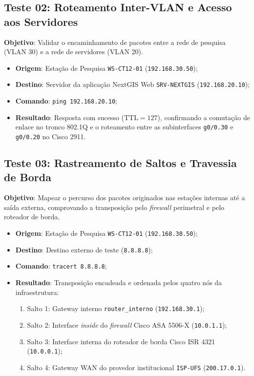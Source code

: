 \subsection{Teste 02: Roteamento Inter-VLAN e Acesso aos Servidores}
\textbf{Objetivo}: Validar o encaminhamento de pacotes entre a rede de pesquisa (VLAN 30) e a rede de servidores (VLAN 20).
\begin{itemize}
    \item \textbf{Origem}: Estação de Pesquisa \texttt{WS-CT12-01} (\texttt{192.168.30.50});
    \item \textbf{Destino}: Servidor da aplicação NextGIS Web \texttt{SRV-NEXTGIS} (\texttt{192.168.20.10});
    \item \textbf{Comando}: \texttt{ping 192.168.20.10};
    \item \textbf{Resultado}: Resposta com sucesso ($\text{TTL} = 127$), confirmando a comutação de enlace no tronco 802.1Q e o roteamento entre as subinterfaces \texttt{g0/0.30} e \texttt{g0/0.20} no Cisco 2911.
\end{itemize}

\subsection{Teste 03: Rastreamento de Saltos e Travessia de Borda}
\textbf{Objetivo}: Mapear o percurso dos pacotes originados nas estações internas até a saída externa, comprovando a transposição pelo \textit{firewall} perimetral e pelo roteador de borda.
\begin{itemize}
    \item \textbf{Origem}: Estação de Pesquisa \texttt{WS-CT12-01} (\texttt{192.168.30.50});
    \item \textbf{Destino}: Destino externo de teste (\texttt{8.8.8.8});
    \item \textbf{Comando}: \texttt{tracert 8.8.8.8};
    \item \textbf{Resultado}: Transposição encadeada e ordenada pelos quatro nós da infraestrutura:
    \begin{enumerate}
        \item Salto 1: Gateway interno \texttt{router\_interno} (\texttt{192.168.30.1});
        \item Salto 2: Interface \textit{inside} do \textit{firewall} Cisco ASA 5506-X (\texttt{10.0.1.1});
        \item Salto 3: Interface interna do roteador de borda Cisco ISR 4321 (\texttt{10.0.0.1});
        \item Salto 4: Gateway WAN do provedor institucional \texttt{ISP-UFS} (\texttt{200.17.0.1}).
    \end{enumerate}
\end{itemize}


